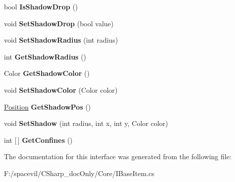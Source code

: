 \begin{DoxyCompactItemize}
bool {\bfseries Is\+Shadow\+Drop} ()
\item 
\mbox{\label{interface_space_v_i_l_1_1_core_1_1_i_base_item_ada0aea4ea1e78acff64faee35e58bb9f}} 
void {\bfseries Set\+Shadow\+Drop} (bool value)
\item 
\mbox{\label{interface_space_v_i_l_1_1_core_1_1_i_base_item_a4eccb5110f10f763a159c9034b1bfbf8}} 
void {\bfseries Set\+Shadow\+Radius} (int radius)
\item 
\mbox{\label{interface_space_v_i_l_1_1_core_1_1_i_base_item_aec002ae19753be8723b2d0fc07a2b9d5}} 
int {\bfseries Get\+Shadow\+Radius} ()
\item 
\mbox{\label{interface_space_v_i_l_1_1_core_1_1_i_base_item_a64efed99ccbddd1ae2f0003b5497f0a4}} 
Color {\bfseries Get\+Shadow\+Color} ()
\item 
\mbox{\label{interface_space_v_i_l_1_1_core_1_1_i_base_item_a6c4fdb19a36657da9bb23c1f94fd8681}} 
void {\bfseries Set\+Shadow\+Color} (Color color)
\item 
\mbox{\label{interface_space_v_i_l_1_1_core_1_1_i_base_item_ab4030e9ed3774554f911a7d4c59957ee}} 
\mbox{\hyperlink{class_space_v_i_l_1_1_core_1_1_position}{Position}} {\bfseries Get\+Shadow\+Pos} ()
\item 
\mbox{\label{interface_space_v_i_l_1_1_core_1_1_i_base_item_a549826d52383f33dd94768b4cd643595}} 
void {\bfseries Set\+Shadow} (int radius, int x, int y, Color color)
\item 
\mbox{\label{interface_space_v_i_l_1_1_core_1_1_i_base_item_ac63b1b301b574f6cb61e3eaa02a84f55}} 
int \mbox{[}$\,$\mbox{]} {\bfseries Get\+Confines} ()
\end{DoxyCompactItemize}


The documentation for this interface was generated from the following file\+:\begin{DoxyCompactItemize}
\item 
F\+:/spacevil/\+C\+Sharp\+\_\+doc\+Only/\+Core/I\+Base\+Item.\+cs\end{DoxyCompactItemize}

